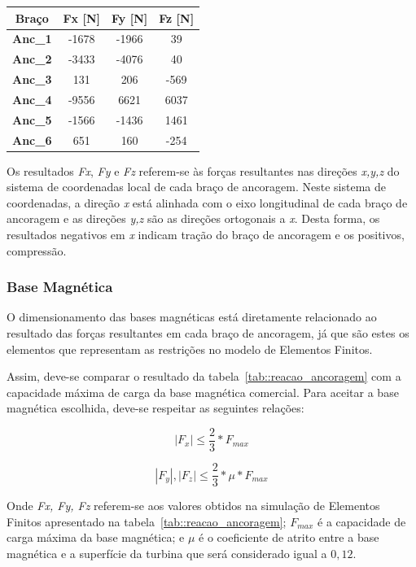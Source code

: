 \begin{center}
\centering
\begin{tabular}{|c|c|c|c|}
\hline
\textbf{Braço}  & \textbf{Fx {[}N{]}} & \textbf{Fy {[}N{]}} & \textbf{Fz {[}N{]}} \\ \hline
\textbf{Anc\_1} & -1678               & -1966               & 39                  \\ \hline
\textbf{Anc\_2} & -3433               & -4076               & 40                  \\ \hline
\textbf{Anc\_3} & 131                 & 206                 & -569                \\ \hline
\textbf{Anc\_4} & -9556               & 6621                & 6037                \\ \hline
\textbf{Anc\_5} & -1566               & -1436               & 1461                \\ \hline
\textbf{Anc\_6} & 651                 & 160                 & -254                \\ \hline
\end{tabular}
\label{tab::reacao_ancoragem}
\end{center}

Os resultados \textit{Fx}, \textit{Fy} e \textit{Fz} referem-se às forças
resultantes nas direções \textit{x,y,z} do sistema de coordenadas local de cada
braço de ancoragem. Neste sistema de coordenadas, a direção \textit{x} está
alinhada com o eixo longitudinal de cada braço de ancoragem e as direções
\textit{y,z} são as direções ortogonais a \textit{x}. 
Desta forma, os resultados negativos em \textit{x} indicam tração do
braço de ancoragem e os positivos, compressão.

\subsubsection{Base Magnética}

O dimensionamento das bases magnéticas está diretamente relacionado ao resultado
das forças resultantes em cada braço de ancoragem, já que são estes os elementos
que representam as restrições no modelo de Elementos Finitos.

Assim, deve-se comparar o resultado da tabela~\ref{tab::reacao_ancoragem} com a
capacidade máxima de carga da base magnética comercial. Para aceitar a base
magnética escolhida, deve-se respeitar as seguintes relações:

 \begin{equation*}
	|F_{x}|\leq\frac{2}{3}*F_{max}
\end{equation*}

 \begin{equation*}
	|F_{y}|,|F_{z}|\leq\frac{2}{3}*\mu*F_{max}
\end{equation*}

Onde \textit{Fx, Fy, Fz} referem-se aos valores obtidos na simulação de
Elementos Finitos apresentado na tabela~\ref{tab::reacao_ancoragem};
$F_{max}$ é a capacidade de carga máxima da base magnética; e $\mu$ é o
coeficiente de atrito entre a base magnética e a superfície da turbina que será
considerado igual a $0,12$.

